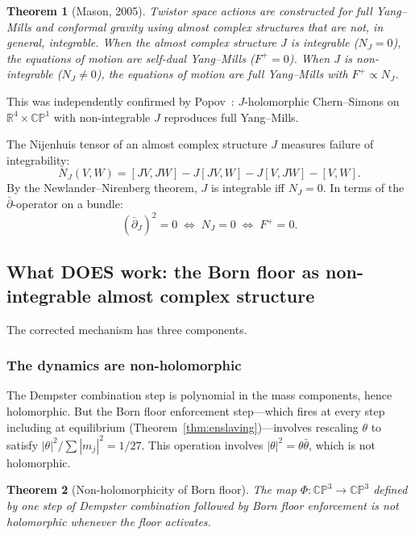 \documentclass[11pt,a4paper]{article}
\newtheorem{theorem}{Theorem}[section]
\theoremstyle{definition}
\theoremstyle{remark}
\newcommand{\CP}{\mathbb{CP}}
\newcommand{\R}{\mathbb{R}}
\newcommand{\dbar}{\bar{\partial}}
\begin{document}
\begin{theorem}[Mason, 2005]\label{thm:mason_orig}
Twistor space actions are constructed for full Yang--Mills and conformal gravity using almost complex structures that are not, in general, integrable. When the almost complex structure $J$ is integrable ($N_J=0$), the equations of motion are self-dual Yang--Mills ($F^+=0$). When $J$ is non-integrable ($N_J\neq 0$), the equations of motion are full Yang--Mills with $F^+\propto N_J$.
\end{theorem}

This was independently confirmed by Popov~\cite{Popov2021}: $J$-holomorphic Chern--Simons on $\R^4\times\CP^1$ with non-integrable $J$ reproduces full Yang--Mills.

The Nijenhuis tensor of an almost complex structure $J$ measures failure of integrability:
\begin{equation}
N_J(V,W)=[JV,JW]-J[JV,W]-J[V,JW]-[V,W].
\end{equation}
By the Newlander--Nirenberg theorem, $J$ is integrable iff $N_J=0$. In terms of the $\dbar$-operator on a bundle:
\begin{equation}\label{eq:dbar_sq}
(\dbar_J)^2=0\;\Longleftrightarrow\;N_J=0\;\Longleftrightarrow\;F^+=0.
\end{equation}


\subsection{What DOES work: the Born floor as non-integrable almost complex structure}

The corrected mechanism has three components.

\subsubsection{The dynamics are non-holomorphic}

The Dempster combination step is polynomial in the mass components, hence holomorphic. But the Born floor enforcement step---which fires at every step including at equilibrium (Theorem~\ref{thm:enslaving})---involves rescaling $\theta$ to satisfy $|\theta|^2/\sum|m_j|^2=1/27$. This operation involves $|\theta|^2=\theta\bar{\theta}$, which is not holomorphic.

\begin{theorem}[Non-holomorphicity of Born floor]\label{thm:nonholo}
The map $\Phi:\CP^3\to\CP^3$ defined by one step of Dempster combination followed by Born floor enforcement is not holomorphic whenever the floor activates.
\end{theorem}
\end{document}
